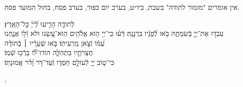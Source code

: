 \documentclass[twoside, openany, parskip=half, 11pt]{book}
\begin{document}
\begin{narrow}
\begin{scriptsize} %
\textsf{
אין אומרים "מזמור לתודה" בשבת, ביו״ט, בערב יום כפור, בערב פסח, בחול המועד פסח.\\
}\end{scriptsize}
 לְֿתוֹדָ֑ה \hfill
הָרִ֥יעוּ לַ֝ייָ֗ כׇּל־הָאָֽרֶץ׃\\
עִבְד֣וּ אֶת־יְיָ֣ בְּֿשִׂמְחָ֑ה \hfill בֹּ֥אוּ לְֿ֝פָנָ֗יו בִּרְנָנָֽה׃
דְּֿע֗וּ כִּֽי־יְיָ ה֤וּא אֱלֹ֫הִ֥ים \hfill הֽוּא־עָ֭שָׂנוּ ולא וְֿל֣וֹ אֲנַ֑חְנוּ\\ עַ֝מּ֗וֹ וְֿצֹ֣אן מַרְעִיתֽוֹ׃ \hfill
בֹּ֤אוּ שְֿׁעָרָ֨יו ׀ בְּֿתוֹדָ֗ה \\ חֲצֵרֹתָ֥יו בִּתְהִלָּ֑ה \hfill הוֹדוּ־ל֗֝וֹ בָּרְֿכ֥וּ שְֿׁמֽוֹ׃\\
כִּי־ט֣וֹב יְיָ֭ לְֿעוֹלָ֣ם חַסְדּ֑וֹ \hfill וְֿעַד־דֹּ֥ר וָ֝דֹ֗ר אֱמוּנָתֽוֹ׃
\end{narrow}
,
\end{document}
